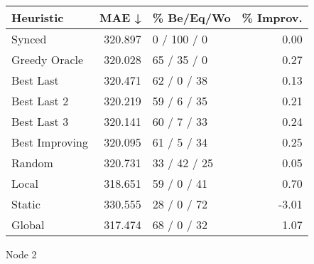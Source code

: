 \begin{tabular}{lrlr}
\toprule
\textbf{Heuristic} & \textbf{MAE ↓} & \textbf{\% Be/Eq/Wo} & \textbf{\% Improv.} \\
\midrule
            Synced &        320.897 &          0 / 100 / 0 &                0.00 \\
     Greedy Oracle &        320.028 &          65 / 35 / 0 &                0.27 \\
         Best Last &        320.471 &          62 / 0 / 38 &                0.13 \\
       Best Last 2 &        320.219 &          59 / 6 / 35 &                0.21 \\
       Best Last 3 &        320.141 &          60 / 7 / 33 &                0.24 \\
    Best Improving &        320.095 &          61 / 5 / 34 &                0.25 \\
            Random &        320.731 &         33 / 42 / 25 &                0.05 \\
             Local &        318.651 &          59 / 0 / 41 &                0.70 \\
            Static &        330.555 &          28 / 0 / 72 &               -3.01 \\
            Global &        317.474 &          68 / 0 / 32 &                1.07 \\
\bottomrule
\end{tabular}
\caption{Node 2}
\label{tab:non_lr01_le1_bs4_2}
